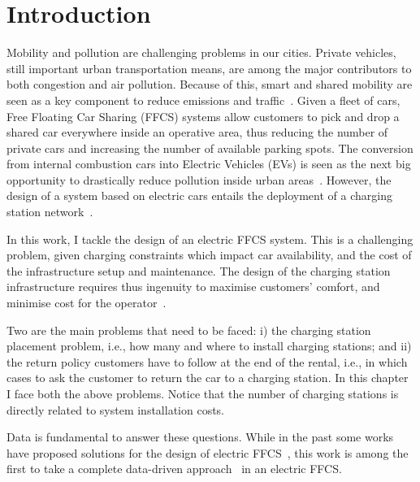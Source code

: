 \section{Introduction}
\label{sec:7_1_intro}


Mobility and pollution are challenging problems in our cities. Private vehicles, still  important urban transportation means, are among the major contributors to both congestion and air pollution. Because of this, smart and shared mobility are seen as a key component to reduce emissions and traffic~\cite{Firnkorn2011}.
Given a fleet of cars, Free Floating Car Sharing (FFCS) systems allow customers to pick and drop a shared car everywhere inside an operative area, thus reducing the number of private cars and increasing the number of available parking spots.
The conversion from internal combustion cars into Electric Vehicles (EVs) is seen as the next big opportunity to drastically reduce pollution inside urban areas~\cite{FM15}. However, the design of a system based on electric cars entails the deployment of a charging station network~\cite{plugPowers}.


In this work, I tackle the design of an electric FFCS system. This is a challenging problem, given charging constraints which impact car availability, and the cost of the infrastructure setup and maintenance.
The design of the charging station infrastructure requires thus ingenuity to maximise customers' comfort, and minimise cost for the operator~\cite{PlacementAndPowergrid,placementAustin,mipCSPpechino}. 

Two are the main problems that need to be faced: i) the charging station placement problem, i.e., how many and where to install charging stations; and ii) the return policy customers have to follow at the end of the rental, i.e., in which cases to ask the customer to return the car to a charging station. In this chapter I face both the above problems. Notice that the number of charging stations is directly related to system installation costs.

Data is fundamental to answer these questions. While in the past some works have proposed solutions for the design of electric FFCS~\cite{FM15,WB15}, this work is among the first to take a complete data-driven approach~\cite{PlacementAndPowergrid,placementAustin,mipCSPpechino,ChargingStationForVehicularNetworks,3_RickenbergGebhardtBreitner_2013,5_SonnebergKune_2015} in an electric FFCS. 


